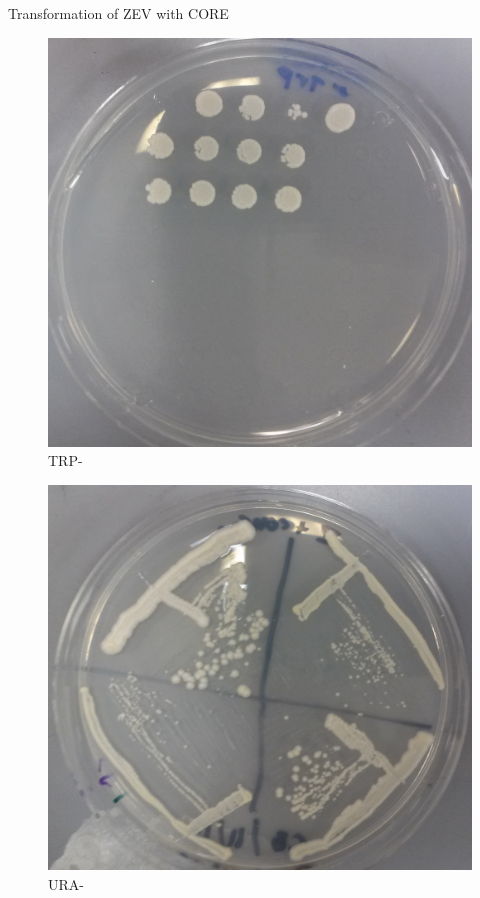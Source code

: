 \documentclass{beamer}
\begin{document}
\begin{frame}{Transformation of ZEV with CORE}
\hfill
    \begin{minipage}[ht!]{0.4\textwidth}
    \begin{figure}[ht!]
        \centering
        \includegraphics[width=.8\textwidth]{TRP.png}
        \caption{TRP-}
        \label{fig:trp}
    \end{figure}
    \begin{figure}[ht!]
        \centering
        \includegraphics[width=.8\textwidth]{TransformURA2.png}
        \caption{URA-}
        \label{fig:ura2}
    \end{figure}
    \end{minipage}
\end{frame}
\end{document}
